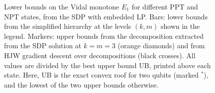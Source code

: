 %
\begin{figure}
  \centering
  \caption{Lower bounds on the Vidal monotone $E_1$ for different PPT and NPT states, from the SDP with embedded LP. Bars: lower bounds from the simplified hierarchy at the levels $(k,m)$ shown in the legend. Markers: upper bounds from the decomposition extracted from the SDP solution at $k=m=3$ (orange diamonds) and from HJW gradient descent over decompositions (black crosses). All values are divided by the best upper bound UB, printed above each state. Here, UB is the exact convex roof for two qubits (marked $^*$), and the lowest of the two upper bounds otherwise.}
  \label{fig:Vidal}
\end{figure}
